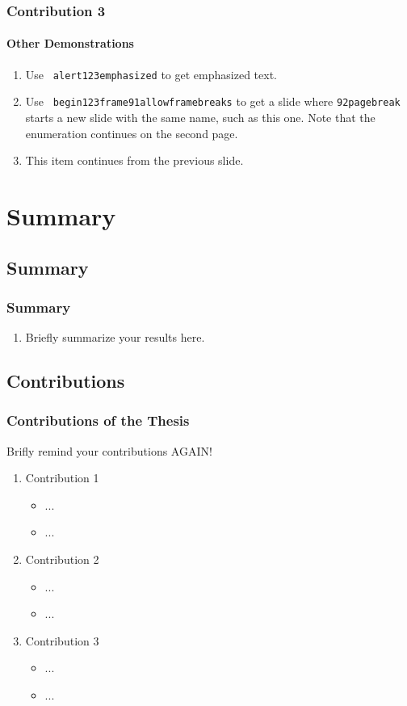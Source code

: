 \documentclass[a4paper]{beamer}
\begin{document}
\begin{frame}[allowframebreaks]
\frametitle{Contribution 3}
\framesubtitle{Other Demonstrations}
\begin{enumerate}
\item Use {\tt {} alert\char123emphasized} to get \alert{emphasized} text.
\item Use {\tt {} begin\char123frame\char91allowframebreaks} to get a slide where {\tt\char92pagebreak} starts a new slide with the same name, such as this one. Note that the enumeration continues on the second page.
\pagebreak
\item This item continues from the previous slide.
\end{enumerate}
\end{frame}

\section{Summary}
\subsection*{Summary}
\begin{frame}
\frametitle{Summary}
\begin{enumerate}
\item Briefly summarize your results here.
\end{enumerate}
\end{frame}

\subsection*{Contributions}
\begin{frame}
\frametitle{Contributions of the Thesis}
Brifly remind your contributions AGAIN!
\bigskip
\begin{enumerate}
\item Contribution 1
\begin{itemize}
\item ...
\item ...
\end{itemize}
\vspace*{.5cm}
\item Contribution 2
\begin{itemize}
\item ...
\item ...
\end{itemize}
\vspace*{.5cm}
\item Contribution 3
\begin{itemize}
\item ...
\item ...
\end{itemize}
\end{enumerate}
\end{frame}
\end{document}
